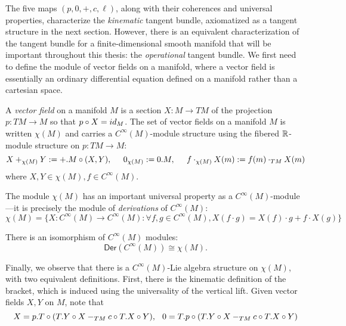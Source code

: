 The five maps $(p, 0, +, c, \ell)$, along with their coherences and universal properties, characterize the \emph{kinematic} tangent bundle, axiomatized as a tangent structure in the next section. However, there is an equivalent characterization of the tangent bundle for a finite-dimensional smooth manifold that will be important throughout this thesis: the \emph{operational} tangent bundle. We first need to define the module of vector fields on a manifold, where a vector field is essentially an ordinary differential equation defined on a manifold rather than a cartesian space. 
\begin{definition}\label{def:operational-tang}
    A \emph{vector field} on a manifold $M$ is a section $X:M \to TM$ of the projection $p:TM \to M$ so that $p \circ X = id_M$. 
    The set of vector fields on a manifold $M$ is written $\chi(M)$ and carries a $C^\infty(M)$-module structure using the fibered $\mathbb{R}$-module structure on $p:TM \to M$:
    \[
        X +_{\chi(M)} Y := +.M \circ (X,Y), \hspace{0.5cm} 0_{\chi(M)} := 0.M,\hspace{0.5cm} f \cdot_{\chi(M)} X (m) := f(m) \cdot_{TM} X(m)
    \]
    where $X,Y \in \chi(M), f \in C^\infty(M)$.
\end{definition}
The module $\chi(M)$ has an important universal property as a $C^\infty(M)$-module---it is precisely the module of \emph{derivations} of $C^\infty(M)$:
 \[
        \chi(M) = \{ X: C^\infty(M) \to C^\infty(M) : \forall f, g \in C^\infty(M), X(f\cdot g) = X(f)\cdot g + f \cdot X(g) \}
\]
\begin{proposition}\label{prop:derivations-tangent-bundle}
    There is an isomorphism of $C^\infty(M)$ modules:
    \[
        \mathsf{Der}(C^\infty(M)) \cong \chi(M).  
    \]
\end{proposition}
Finally, we observe that there is a $C^\infty(M)$-Lie algebra structure on $\chi(M)$, with two equivalent definitions. First, there is the kinematic definition of the bracket, which is induced using the universality of the vertical lift. Given vector fields $X,Y$ on $M$, note that
\[
   X = p.T \circ (T.Y \circ X -_{TM} c \circ T.X \circ Y), \hspace{0.25cm}
   0 = T.p \circ (T.Y \circ X -_{TM} c \circ T.X \circ Y)
\]
